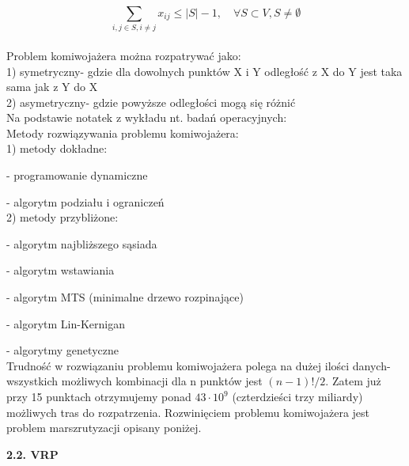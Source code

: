 \documentclass[a4paper, twoside, 12pt, justified]{article}
\begin{document}
	  \begin{equation}
	  	  {\sum\limits_{i,j \in S, i \neq j} x_{ij} \leq |S| - 1, \quad \forall S \subset V, S \neq \emptyset }
	  \end{equation}\\
	
	
	
	Problem komiwojażera można rozpatrywać jako:\\
	1) symetryczny- gdzie dla dowolnych punktów X i Y odległość z X do Y jest taka sama jak z Y do X\\
	2) asymetryczny- gdzie powyższe odległości mogą się różnić\\
	
	Na podstawie notatek z wykładu nt. badań operacyjnych:\\
	Metody rozwiązywania problemu komiwojażera:\\
	1) metody dokładne:

	\hspace{5mm}- programowanie dynamiczne

	\hspace{5mm}- algorytm podziału i ograniczeń\\
	2) metody przybliżone:
	
	\hspace{5mm}- algorytm najbliższego sąsiada
	
	\hspace{5mm}- algorytm wstawiania
	
	\hspace{5mm}- algorytm MTS (minimalne drzewo rozpinające)
	
	\hspace{5mm}- algorytm Lin-Kernigan
	
	\hspace{5mm}- algorytmy genetyczne\\
	
	Trudność w rozwiązaniu problemu komiwojażera polega na dużej ilości danych- wszystkich możliwych kombinacji dla n punktów jest $(n-1)!/2$. Zatem już przy 15 punktach otrzymujemy ponad $43\cdot10^9$ (czterdzieści trzy miliardy) możliwych tras do rozpatrzenia. Rozwinięciem problemu komiwojażera jest problem marszrutyzacji opisany poniżej.
	
	\begin{flushleft}
		\begin{large}
			\textbf{2.2. VRP}
		\end{large}
	\end{flushleft}
	\vspace{5mm} %
	
\end{document}
